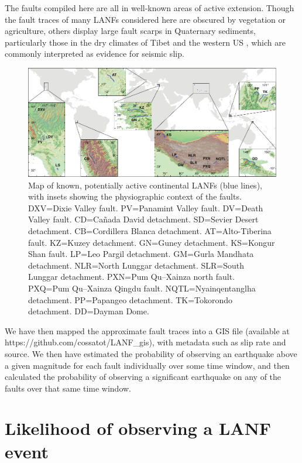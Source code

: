 \documentclass[twocolumn,grl]{AGUTeX}
\begin{document}
\begin{article}
The faults compiled here are all in well-known areas of active extension.  Though the fault traces of many LANFs considered here are obscured by vegetation or agriculture, others display large fault scarps in Quaternary sediments, particularly those in the dry climates of Tibet \citep[e.g.,][]{styron2013slr, kapp2005nqtl} and the western US \citep[e.g.,][]{axen1999baja, hayman2003dv}, which are commonly interpreted as evidence for seismic slip.%


\begin{figure}
\noindent\includegraphics[width=40pc]{./figures/active_lanfs_map_insets.pdf}
\caption{Map of known, potentially active continental LANFs (blue lines), with insets showing the physiographic context of the faults.  DXV=Dixie Valley fault.  PV=Panamint Valley fault.  DV=Death Valley fault.  CD=Ca\~nada David detachment.  SD=Sevier Desert detachment.  CB=Cordillera Blanca detachment.  AT=Alto-Tiberina fault.  KZ=Kuzey detachment.  GN=Guney detachment.  KS=Kongur Shan fault.  LP=Leo Pargil detachment.  GM=Gurla Mandhata detachment. NLR=North Lunggar detachment.  SLR=South Lunggar detachment.  PXN=Pum Qu--Xainza north fault.  PXQ=Pum Qu--Xainza Qingdu fault.  NQTL=Nyainqentanglha detachment.  PP=Papangeo detachment.  TK=Tokorondo detachment.  DD=Dayman Dome.}
\label{fig:lanf_map}
\end{figure}

We have then mapped the approximate fault traces into a GIS file (available at https://github.com/cossatot/LANF\_gis), with metadata such as slip rate and source. We then have estimated the probability of observing an earthquake above a given magnitude for each fault individually over some time window, and then calculated the probability of observing a significant earthquake on any of the faults over that same time window.

\section{Likelihood of observing a LANF event}

\end{article}
\end{document}
